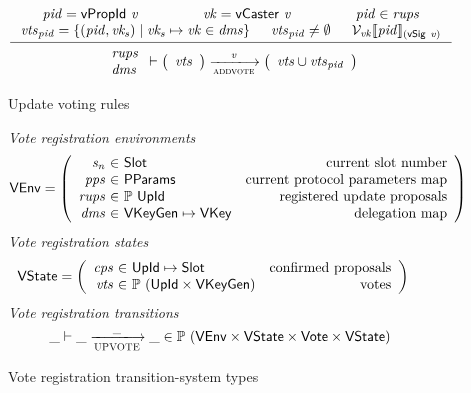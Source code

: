 \begin{figure}[htb]
  \begin{equation}
    \label{eq:rule:voting}
    \inference
    {
      \var{pid} = \vPropId{v} & \var{vk} = \vCaster{v} & \var{pid} \in \var{rups}\\
      \var{vts}_{\var{pid}} =
      \{ (\var{pid}, \var{vk_s}) \mid \var{vk_s} \mapsto \var{vk} \in \var{dms} \} &
      \var{vts}_{\var{pid}} \neq \emptyset &
      \mathcal{V}_{\var{vk}}\serialised{\var{pid}}_{(\vSig{v})}\\
    }
    {
      {
        \begin{array}{l}
          \var{rups}\\
          \var{dms}
        \end{array}
      }
      \vdash
      {
        \left(
          \begin{array}{l}
            \var{vts}
          \end{array}
        \right)
      }
      \trans{addvote}{\var{v}}
      {
        \left(
          \begin{array}{l}
            \var{vts} \cup \var{vts}_{\var{pid}}\\
          \end{array}
        \right)
      }
    }
  \end{equation}
  \caption{Update voting rules}
  \label{fig:rules:voting}
\end{figure}

\clearpage

\begin{figure}[htb]
  \emph{Vote registration environments}
  \begin{align*}
    & \VEnv
      = \left(
      \begin{array}{r@{~\in~}lr}
        \var{s_n} & \Slot & \text{current slot number}\\
        \var{pps} & \PPMMap & \text{current protocol parameters map}\\
        \var{rups} & \powerset{\UPropId}
        & \text{registered update proposals}\\
        \var{dms} & \VKeyGen \mapsto \VKey & \text{delegation map}
      \end{array}\right)
  \end{align*}
  \emph{Vote registration states}
  \begin{align*}
    & \VState
      = \left(
      \begin{array}{r@{~\in~}lr}
        \var{cps} & \UPropId \mapsto \Slot & \text{confirmed proposals}\\
        \var{vts} & \powerset{(\UPropId \times \VKeyGen)} & \text{votes}
      \end{array}\right)
  \end{align*}
  \emph{Vote registration transitions}
    \begin{equation*}
    \_ \vdash \_ \trans{UPVOTE}{\_} \_ \in
    \powerset (\VEnv \times \VState \times \Vote \times \VState)
    \end{equation*}
  \caption{Vote registration transition-system types}
  \label{fig:ts-types:vote-reg}
\end{figure}

